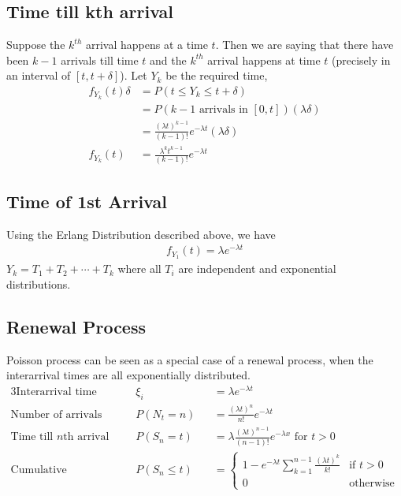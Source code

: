 \documentclass[../probability-notes.tex]{subfiles}
\begin{document}
    \subsection{Time till kth arrival}
    Suppose the $k^{th}$ arrival happens at a time $t$. Then we are saying that there have been $k-1$ arrivals till time $t$ and the $k^{th}$ arrival happens at time $t$ (precisely in an interval of $[t, t+\delta]$). Let $Y_{k}$ be the required time,
    \begin{align*}
        f_{Y_{k}}(t)\delta &= P(t \leq Y_{k} \leq t+\delta)\\
                    &= P(\text{$k-1$ arrivals  in $[0,t]$}) (\lambda \delta)\\
                    &= \frac{(\lambda t)^{k-1}}{(k-1)!}e^{-\lambda t}(\lambda \delta)\\
        f_{Y_{k}}(t) &= \frac{\lambda^{k} t^{k-1}}{(k-1)!}e^{-\lambda t} \tag*{Erlang Distribution}
    \end{align*}

    \subsection{Time of 1st Arrival}
    Using the Erlang Distribution described above, we have
    \begin{align*}
        f_{Y_{1}}(t) = \lambda e^{-\lambda t}
    \end{align*}
    $Y_{k} = T_{1} + T_{2} + \cdots + T_{k}$ where all $T_{i}$ are independent and exponential distributions.


    \subsection{Renewal Process}
    Poisson process can be seen as a special case of a renewal process, when the interarrival times are all exponentially distributed.
    \begin{alignat*}{3}
        \text{Interarrival time }& \xi_{i}&& = \lambda e^{-\lambda t}\\
        \text{Number of arrivals }& P(N_{t} = n)&& = \frac{(\lambda t)^{n}}{n!} e^{-\lambda t}\\
        \text{Time till $n$th arrival }& P(S_{n} = t)&& = \lambda \frac{(\lambda t)^{n-1}}{(n-1)!} e^{-\lambda x} \text{ for $t > 0$}\\
        \text{Cumulative distribution }& P(S_{n} \leq t)&& = \begin{cases} 1 - e^{-\lambda t} \sum_{k=1}^{n-1} \frac{(\lambda t)^{k}}{k!} &\mbox{if $t > 0$}\\
        0 &\mbox{otherwise} \end{cases}
    \end{alignat*}
\end{document}
